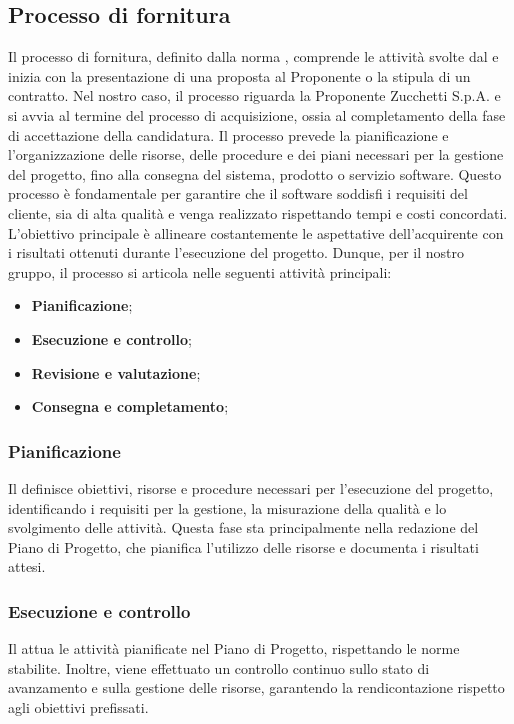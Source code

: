 \subsection{Processo di fornitura}
\label{subsection:processo_fornitura}
Il processo di fornitura, definito dalla norma , comprende le attività svolte dal  e inizia con la presentazione di una proposta al Proponente o la stipula di un contratto. Nel nostro caso, il processo riguarda la Proponente Zucchetti S.p.A. e si avvia al termine del processo di acquisizione, ossia al completamento della fase di accettazione della candidatura.
Il processo prevede la pianificazione e l’organizzazione delle risorse, delle procedure e dei piani necessari per la gestione del progetto, fino alla consegna del sistema, prodotto o servizio software. Questo processo è fondamentale per garantire che il software soddisfi i requisiti del cliente, sia di alta qualità e venga realizzato rispettando tempi e costi concordati. L’obiettivo principale è allineare costantemente le aspettative dell’acquirente con i risultati ottenuti durante l’esecuzione del progetto.
Dunque, per il nostro gruppo, il processo si articola nelle seguenti attività principali:
\begin{itemize}
    \item \textbf{Pianificazione};
    \item \textbf{Esecuzione e controllo};
    \item \textbf{Revisione e valutazione};
    \item \textbf{Consegna e completamento};
\end{itemize}

\subsubsection{Pianificazione}
Il  definisce obiettivi, risorse e procedure necessari per l’esecuzione del progetto, identificando i requisiti per la gestione, la misurazione della qualità e lo svolgimento delle attività. Questa fase sta principalmente nella redazione del Piano di Progetto, che pianifica l’utilizzo delle risorse e documenta i risultati attesi.

\subsubsection{Esecuzione e controllo}
Il  attua le attività pianificate nel Piano di Progetto, rispettando le norme stabilite. Inoltre, viene effettuato un controllo continuo sullo stato di avanzamento e sulla gestione delle risorse, garantendo la rendicontazione rispetto agli obiettivi prefissati. 

